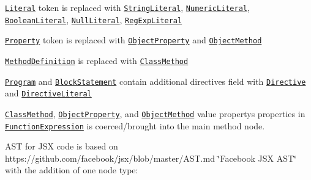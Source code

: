 \begin{DoxyItemize}
\item \href{https://github.com/estree/estree/blob/master/es5.md#literal}{\tt Literal} token is replaced with \href{https://github.com/babel/babylon/blob/master/ast/spec.md#stringliteral}{\tt String\+Literal}, \href{https://github.com/babel/babylon/blob/master/ast/spec.md#numericliteral}{\tt Numeric\+Literal}, \href{https://github.com/babel/babylon/blob/master/ast/spec.md#booleanliteral}{\tt Boolean\+Literal}, \href{https://github.com/babel/babylon/blob/master/ast/spec.md#nullliteral}{\tt Null\+Literal}, \href{https://github.com/babel/babylon/blob/master/ast/spec.md#regexpliteral}{\tt Reg\+Exp\+Literal}
\item \href{https://github.com/estree/estree/blob/master/es5.md#property}{\tt Property} token is replaced with \href{https://github.com/babel/babylon/blob/master/ast/spec.md#objectproperty}{\tt Object\+Property} and \href{https://github.com/babel/babylon/blob/master/ast/spec.md#objectmethod}{\tt Object\+Method}
\item \href{https://github.com/estree/estree/blob/master/es2015.md#methoddefinition}{\tt Method\+Definition} is replaced with \href{https://github.com/babel/babylon/blob/master/ast/spec.md#classmethod}{\tt Class\+Method}
\item \href{https://github.com/babel/babylon/blob/master/ast/spec.md#programs}{\tt Program} and \href{https://github.com/babel/babylon/blob/master/ast/spec.md#blockstatement}{\tt Block\+Statement} contain additional {\ttfamily directives} field with \href{https://github.com/babel/babylon/blob/master/ast/spec.md#directive}{\tt Directive} and \href{https://github.com/babel/babylon/blob/master/ast/spec.md#directiveliteral}{\tt Directive\+Literal}
\item \href{https://github.com/babel/babylon/blob/master/ast/spec.md#classmethod}{\tt Class\+Method}, \href{https://github.com/babel/babylon/blob/master/ast/spec.md#objectproperty}{\tt Object\+Property}, and \href{https://github.com/babel/babylon/blob/master/ast/spec.md#objectmethod}{\tt Object\+Method} value property\textquotesingle{}s properties in \href{https://github.com/babel/babylon/blob/master/ast/spec.md#functionexpression}{\tt Function\+Expression} is coerced/brought into the main method node.
\end{DoxyItemize}

A\+ST for J\+SX code is based on https\+://github.com/facebook/jsx/blob/master/\+A\+S\+T.\+md \char`\"{}\+Facebook J\+S\+X A\+S\+T\char`\"{} with the addition of one node type\+:


